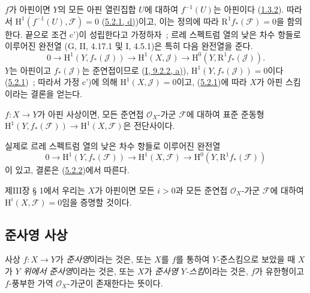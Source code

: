 $f$가 아핀이면 $Y$의 모든 아핀 열린집합 $U$에 대하여
$f^{-1}(U)$는 아핀이다 (\hyperref[II.1.3.2-ko]{1.3.2}). 따라서
$\mathrm{H}^1(f^{-1}(U),\mathcal{F})=0$
(\hyperref[II.5.2.1-ko]{5.2.1, d)})이고, 이는 정의에 따라
$\mathrm{R}^1f_*(\mathcal{F})=0$을 함의한다. 끝으로 조건 c')이
성립한다고 가정하자~; 르레 스펙트럼 열의 낮은 차수 항들로 이루어진
완전열 (G, II, 4.17.1 및 I, 4.5.1)은 특히 다음 완전열을 준다.
\[
  0\to\mathrm{H}^1(Y,f_*(\mathcal{J}))\to
  \mathrm{H}^1(X,\mathcal{J})\to
  \mathrm{H}^0(Y,\mathrm{R}^1f_*(\mathcal{J})).
\]
$Y$는 아핀이고 $f_*(\mathcal{J})$는 준연접이므로
(\hyperref[I.9.2.2-ko]{I, 9.2.2, a)}),
$\mathrm{H}^1(Y,f_*(\mathcal{J}))=0$이다
(\hyperref[II.5.2.1-ko]{5.2.1})~; 따라서 가정 c')에 의해
$\mathrm{H}^1(X,\mathcal{J})=0$이고,
(\hyperref[II.5.2.1-ko]{5.2.1})에 따라 $X$가 아핀 스킴이라는
결론을 얻는다.

\begin{corollary}[5.2.3]
\label{II.5.2.3-ko}
$f:X\to Y$가 아핀 사상이면, 모든 준연접
$\mathcal{O}_X$-가군 $\mathcal{F}$에 대하여 표준 준동형
$\mathrm{H}^1(Y,f_*(\mathcal{F}))\to\mathrm{H}^1(X,\mathcal{F})$은
전단사이다.
\end{corollary}


실제로 르레 스펙트럼 열의 낮은 차수 항들로 이루어진 완전열
\[
  0\to\mathrm{H}^1(Y,f_*(\mathcal{F}))\to
  \mathrm{H}^1(X,\mathcal{F})\to
  \mathrm{H}^0(Y,\mathrm{R}^1f_*(\mathcal{F}))
\]
이 있고, 결론은 (\hyperref[II.5.2.2-ko]{5.2.2})에서 따른다.

\begin{remark}[5.2.4]
\label{II.5.2.4-ko}
제III장 § 1에서 우리는 $X$가 아핀이면 모든 $i>0$과 모든 준연접
$\mathcal{O}_X$-가군 $\mathcal{F}$에 대하여
$\mathrm{H}^i(X,\mathcal{F})=0$임을 증명할 것이다.
\end{remark}

\subsection{준사영 사상}
\label{subsection:II.5.3-ko}

\begin{definition}[5.3.1]
\label{II.5.3.1-ko}
사상 $f:X\to Y$가 \emph{준사영}이라는 것은, 또는 $X$를 $f$를
통하여 $Y$-준스킴으로 보았을 때 $X$가 \emph{$Y$ 위에서 준사영}이라는
것은, 또는 $X$가 \emph{준사영 $Y$-스킴}이라는 것은, $f$가 유한형이고
$f$-풍부한 가역 $\mathcal{O}_X$-가군이 존재한다는 뜻이다.
\end{definition}

